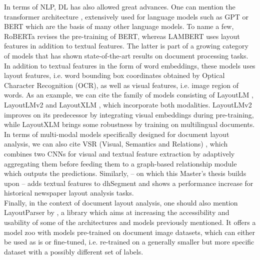 In terms of NLP, DL has also allowed great advances. One can mention the transformer architecture \citep{vaswani_attention_2017}, extensively used for language models such as GPT \citep{brown_language_2020} or BERT \citep{devlin_bert_2019} which are the basis of many other language models. To name a few, RoBERTa \citep{liu_roberta_2019} revises the pre-training of BERT, whereas LAMBERT \citep{garncarek_lambert_2021} uses layout features in addition to textual features. The latter is part of a growing category of models that has shown state-of-the-art results on document processing tasks. In addition to textual features in the form of word embeddings, these models uses layout features, i.e. word bounding box coordinates obtained by Optical Character Recognition (OCR), as well as visual features, i.e. image region of words. As an example, we can cite the family of models consisting of LayoutLM \citep{xu_layoutlm_2019}, LayoutLMv2 \citep{xu_layoutlmv2_2021} and LayoutXLM \citep{xu_layoutxlm_2021}, which incorporate both modalities. LayoutLMv2 improves on its predecessor by integrating visual embeddings during pre-training, while LayoutXLM brings some robustness by training on multilingual documents. In terms of multi-modal models specifically designed for document layout analysis, we can also cite VSR (Visual, Semantics and Relations) \citep{zhang_vsr_2021}, which combines two CNNs for visual and textual feature extraction by adaptively aggregating them before feeding them to a graph-based relationship module which outputs the predictions. Similarly, \citet{barman_combining_2021} -- on which this Master's thesis builds upon -- adds textual features to dhSegment and shows a performance increase for historical newspaper layout analysis tasks.\\
Finally, in the context of document layout analysis, one should also mention LayoutParser by \citet{shen_layoutparser_2021}, a library which aims at increasing the accessibility and usability of some of the architectures and models previously mentioned. It offers a model zoo with models pre-trained on document image datasets, which can either be used as is or fine-tuned, i.e. re-trained on a generally smaller but more specific dataset with a possibly different set of labels.

